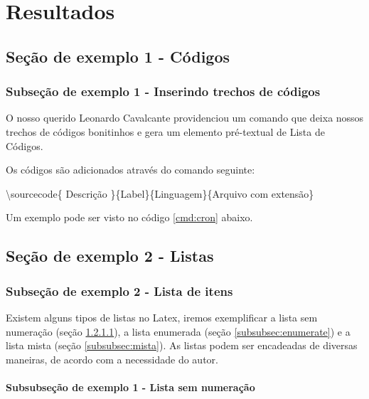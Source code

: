 \chapter{Resultados} \label{ch:RD}



\section{Seção de exemplo 1 - Códigos} \label{sec:resex1}

\subsection{Subseção de exemplo 1 - Inserindo trechos de códigos}
 
O nosso querido Leonardo Cavalcante providenciou um comando que deixa nossos trechos de códigos bonitinhos e gera um elemento pré-textual de Lista de Códigos. 

Os códigos são adicionados através do comando seguinte:

\textbackslash sourcecode\{ Descrição \}\{Label\}\{Linguagem\}\{Arquivo com extensão\}

Um exemplo pode ser visto no código \ref{cmd:cron} abaixo.



\section{Seção de exemplo 2 - Listas} \label{sec:resex2}

\subsection{Subseção de exemplo 2 - Lista de itens} 

Existem alguns tipos de listas no Latex, iremos exemplificar a lista sem numeração (seção \ref{subsubsec:itemize}), a lista enumerada (seção \ref{subsubsec:enumerate}) e a lista mista (seção \ref{subsubsec:mista}). As listas podem ser encadeadas de diversas maneiras,
de acordo com a necessidade do autor.

\subsubsection{Subsubseção de exemplo 1 - Lista sem numeração} \label{subsubsec:itemize}

